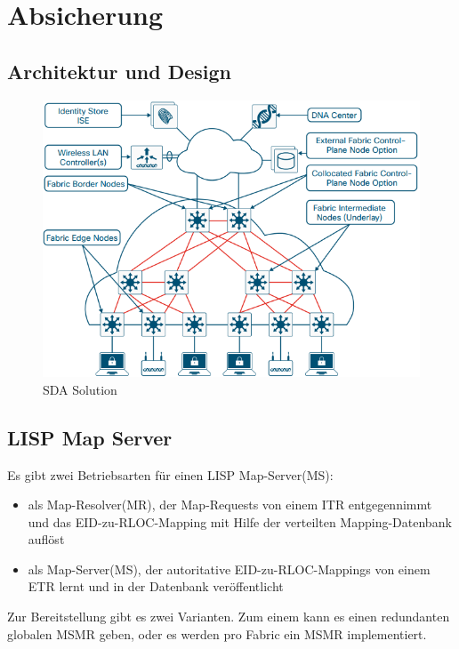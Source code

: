\section{Absicherung}

\subsection{Architektur und Design}



\begin{figure}[H]
	\centering
	\includegraphics[width=1\linewidth]{img/Absicherung/SDA-Architektur}
	\caption{SDA Solution \cite{sda-designguide-sept2018} }
	\label{fig:SDA Solution}
\end{figure}

\subsection{LISP Map Server}
Es gibt zwei Betriebsarten für einen LISP Map-Server(MS): 
\begin{itemize}
	\item als Map-Resolver(MR), der Map-Requests von einem ITR entgegennimmt und das EID-zu-RLOC-Mapping mit Hilfe der verteilten Mapping-Datenbank auflöst
	\item als Map-Server(MS), der autoritative EID-zu-RLOC-Mappings von einem ETR lernt und in der Datenbank veröffentlicht
\end{itemize}

Zur Bereitstellung gibt es zwei Varianten. Zum einem kann es einen redundanten globalen MSMR geben, oder es werden pro Fabric ein MSMR implementiert.

